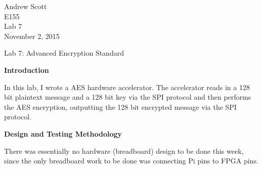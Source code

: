 \documentclass[11pt,letterpaper]{article}
\begin{document}
\begin{flushright}
Andrew Scott\\
E155\\
Lab 7\\
November 2, 2015
\end{flushright}

\begin{center}
Lab 7: Advanced Encryption Standard
\end{center}

\noindent\textbf{Introduction}

In this lab, I wrote a AES hardware accelerator. The accelerator reads in a 128 bit plaintext message and a 128 bit key via the SPI protocol and then performs the AES encryption, outputting the 128 bit encrypted message via the SPI protocol.

\noindent\textbf{Design and Testing Methodology}

There was essentially no hardware (breadboard) design to be done this week, since the only breadboard work to be done was connecting Pi pins to FPGA pins.
\end{document}
